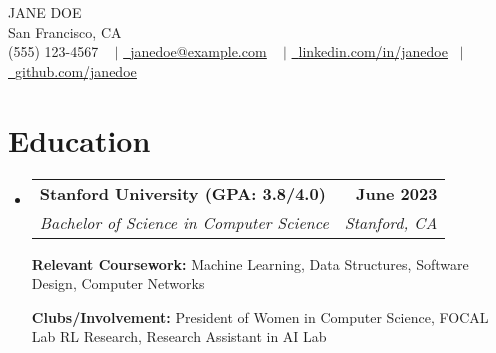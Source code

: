 \documentclass[letterpaper,11pt]{article}
\makeatletter
\newcommand{\resumeSubheading}[4]{
  \vspace{-2pt}\item
    \begin{tabular*}{1.0\textwidth}[t]{l@{\extracolsep{\fill}}r}
      \textbf{#1} & \textbf{\small #2} \\
      \textit{\small#3} & \textit{\small #4} \\
    \end{tabular*}\vspace{-7pt}
}
\newcommand{\resumeSubHeadingListStart}{\begin{itemize}[leftmargin=0.0in, label={}]}
\newcommand{\resumeSubHeadingListEnd}{\end{itemize}}
\makeatother
\begin{document}


\begin{center}
    {\Huge \scshape  JANE DOE  } \\ \vspace{1pt}
                \vspace{-1pt}
    San Francisco, CA \\ \vspace{0pt}
            \vspace{0pt}
    \small \raisebox{-0.1\height} (555) 123-4567 ~ $\vert$ \href{mailto:janedoe@example.com}{\raisebox{-0.2\height}\ \underline{janedoe@example.com}} ~ $\vert$
        \vspace{4pt}
    \href{https://linkedin.com/in/janedoe}{\raisebox{-0.2\height}\ \underline{linkedin.com/in/janedoe}}  ~$\vert$
    \href{https://github.com/janedoe}{\raisebox{-0.2\height}\ \underline{github.com/janedoe}}

    \vspace{-14pt}
\end{center}


\section{Education}
  \resumeSubHeadingListStart
    \resumeSubheading
      {Stanford University (GPA: 3.8/4.0)}{June 2023}
      {Bachelor of Science in Computer Science}{Stanford, CA}
          \vspace{-2pt}

    {\textbf{Relevant Coursework:}  Machine Learning, Data Structures, Software Design, Computer Networks}
          \vspace{-2pt}

    {\textbf{Clubs/Involvement:} President of Women in Computer Science, FOCAL Lab RL Research, Research Assistant in AI Lab}

  \resumeSubHeadingListEnd

\end{document}
